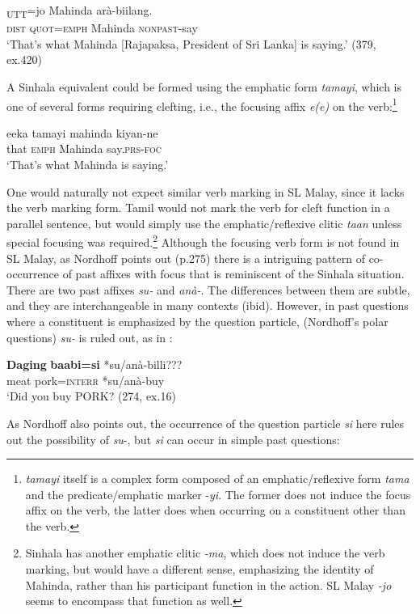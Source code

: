 \ea\label{ex3.7.6} 
\textsubscript{UTT}=jo Mahinda arà-biilang.\\
  \textsc{dist} \textsc{quot}=\textsc{emph} Mahinda \textsc{nonpast}-say\\
   `That's what Mahinda [Rajapaksa, President of Sri Lanka] is saying.'  (379, ex.420)
\z


A Sinhala equivalent could be formed using the emphatic form \textit{tamayi}, which is one of several forms requiring clefting, i.e., the focusing affix \textit{e(e)} on the verb:\footnote{\textit{tamayi}
  itself is a complex form composed of an emphatic/reflexive form \textit{tama} and the predicate/emphatic marker -\textit{yi}. The former does not induce the focus affix on the verb, the latter does when occurring on a constituent other than the verb.
}


\ea\label{ex3.7.7} 
\gll  eeka tamayi mahinda kiyan-ne\\
  that \textsc{emph} Mahinda say.\textsc{prs}-\textsc{foc} \\
  `That's what Mahinda is saying.'
\z


One would naturally not expect similar verb marking in SL Malay, since it lacks the verb marking form. Tamil would not mark the verb for cleft function in a parallel sentence, but would simply use the emphatic/reflexive clitic \textit{taan} unless special focusing was required.\footnote{Sinhala
  has another emphatic clitic \textit{-ma}, which does not induce the verb marking, but would have a different sense, emphasizing the identity of Mahinda, rather than his participant function in the action. SL Malay \textit{-jo} seems to encompass that function as well.} 
 Although the focusing verb form is not found in SL Malay, as Nordhoff points out (p.275) there is a intriguing pattern of co-occurrence of past affixes with focus that is reminiscent of the Sinhala situation. There are two past affixes \textit{su-} and \textit{anà-}. The differences between them are subtle, and they are interchangeable in many contexts (ibid). However, in past questions where a constituent is emphasized by the question particle, (Nordhoff's polar questions) \textit{su-} is ruled out, as in : 


\ea\label{ex3.7.8} 
\gll  \textbf{Daging} \textbf{baabi=si} *su/anà-billi???\\
  meat pork=\textsc{interr} *su/anà-buy\\
  `Did you buy \textsc{PORK}? (274, ex.16)
\z


As Nordhoff also points out, the occurrence of the question particle \textit{si }here rules out the possibility of \textit{su}-, but \textit{si} can occur in simple past questions:


